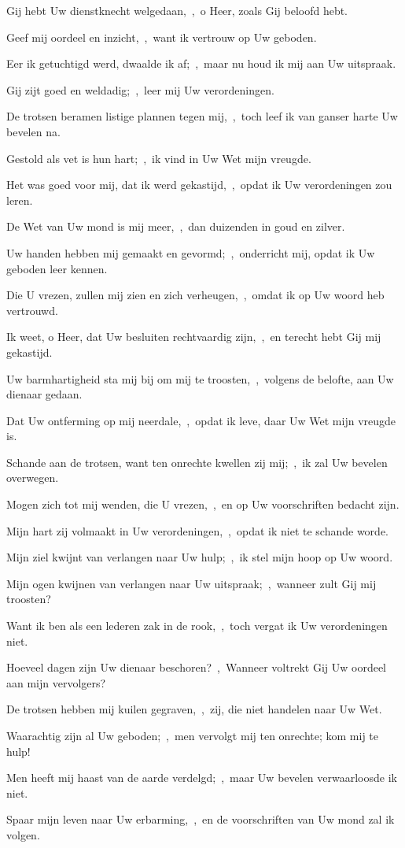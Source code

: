 \documentclass[12pt,twoside,a5paper]{article}
\begin{document}
\begin{halfparskip}
  Gij hebt Uw dienstknecht welgedaan,~\sep\ o Heer, zoals Gij beloofd hebt.


  Geef mij oordeel en inzicht,~\sep\ want ik vertrouw op Uw geboden.

  Eer ik getuchtigd werd, dwaalde ik af;~\sep\ maar nu houd ik mij aan Uw uitspraak.

  Gij zijt goed en weldadig;~\sep\ leer mij Uw verordeningen.

  De trotsen beramen listige plannen tegen mij,~\sep\ toch leef ik van ganser harte Uw bevelen na.

  Gestold als vet is hun hart;~\sep\ ik vind in Uw Wet mijn vreugde.

  Het was goed voor mij, dat ik werd gekastijd,~\sep\ opdat ik Uw verordeningen zou leren.

  De Wet van Uw mond is mij meer,~\sep\ dan duizenden in goud en zilver.

  Uw handen hebben mij gemaakt en gevormd;~\sep\ onderricht mij, opdat ik Uw geboden leer kennen.

  Die U vrezen, zullen mij zien en zich verheugen,~\sep\ omdat ik op Uw woord heb vertrouwd.

  Ik weet, o Heer, dat Uw besluiten rechtvaardig zijn,~\sep\ en terecht hebt Gij mij gekastijd.

  Uw barmhartigheid sta mij bij om mij te troosten,~\sep\ volgens de belofte, aan Uw dienaar gedaan.

  Dat Uw ontferming op mij neerdale,~\sep\ opdat ik leve, daar Uw Wet mijn vreugde is.

  Schande aan de trotsen, want ten onrechte kwellen zij mij;~\sep\ ik zal Uw bevelen overwegen.

  Mogen zich tot mij wenden, die U vrezen,~\sep\ en op Uw voorschriften bedacht zijn.

  Mijn hart zij volmaakt in Uw verordeningen,~\sep\ opdat ik niet te schande worde.

  Mijn ziel kwijnt van verlangen naar Uw hulp;~\sep\ ik stel mijn hoop op Uw woord.

  Mijn ogen kwijnen van verlangen naar Uw uitspraak;~\sep\ wanneer zult Gij mij troosten?

  Want ik ben als een lederen zak in de rook,~\sep\ toch vergat ik Uw verordeningen niet.

  Hoeveel dagen zijn Uw dienaar beschoren?~\sep\ Wanneer voltrekt Gij Uw oordeel aan mijn vervolgers?

  De trotsen hebben mij kuilen gegraven,~\sep\ zij, die niet handelen naar Uw Wet.

  Waarachtig zijn al Uw geboden;~\sep\ men vervolgt mij ten onrechte; kom mij te hulp!

  Men heeft mij haast van de aarde verdelgd;~\sep\ maar Uw bevelen verwaarloosde ik niet.

  Spaar mijn leven naar Uw erbarming,~\sep\ en de voorschriften van Uw mond zal ik volgen.
\end{halfparskip}
\end{document}
